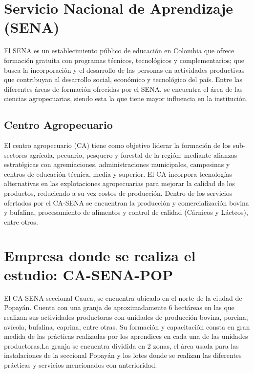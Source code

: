 
\section{Servicio Nacional de Aprendizaje (SENA)}

El SENA es un establecimiento público de educación en Colombia que ofrece formación gratuita con programas técnicos, tecnológicos y complementarios; que busca la incorporación y el desarrollo de las personas en actividades productivas que contribuyan al desarrollo social, económico y tecnológico del país. Entre las diferentes áreas de formación ofrecidas por el SENA, se encuentra el área de las ciencias agropecuarias, siendo esta la que tiene mayor influencia en la institución.\cite{sena}


\subsection{Centro Agropecuario}

El centro agropecuario (CA) tiene como objetivo liderar la formación de los sub-sectores agrícola, pecuario, pesquero y forestal de la región; mediante alianzas estratégicas con agremiaciones, administraciones municipales, campesinas y centros de educación técnica, media y superior. El CA incorpora tecnologías alternativas en las explotaciones agropecuarias para mejorar la calidad de los productos, reduciendo a su vez costos de producción. Dentro de los servicios ofertados por el CA-SENA se encuentran la producción y comercialización bovina y bufalina, procesamiento de alimentos y control de calidad (Cárnicos y Lácteos), entre otros\cite{casena}.

\section{Empresa donde se realiza el estudio: CA-SENA-POP}

El CA-SENA seccional Cauca, se encuentra ubicado en el norte de la ciudad de Popayán. Cuenta con una granja de aproximadamente 6 hectáreas en las que realizan sus actividades productoras con unidades de producción bovina, porcina, avícola, bufalina, caprina, entre otras. Su formación y capacitación consta en gran medida de las prácticas realizadas por los aprendices en cada una de las unidades productoras.La granja se encuentra dividida en 2 zonas, el área usada para las instalaciones de la seccional Popayán y los lotes donde se realizan las diferentes prácticas y servicios mencionados con anterioridad.\\

